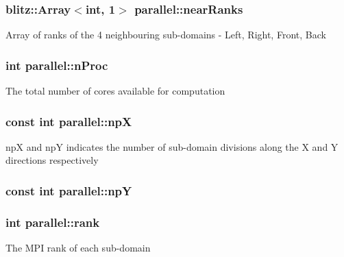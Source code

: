\subsubsection[{\texorpdfstring{near\+Ranks}{nearRanks}}]{\setlength{\rightskip}{0pt plus 5cm}blitz\+::\+Array$<$int, 1$>$ parallel\+::near\+Ranks}\hypertarget{classparallel_a7b13d9a40183bca2c103caf50bb16a51}{}\label{classparallel_a7b13d9a40183bca2c103caf50bb16a51}
Array of ranks of the 4 neighbouring sub-\/domains -\/ Left, Right, Front, Back 
\subsubsection[{\texorpdfstring{n\+Proc}{nProc}}]{\setlength{\rightskip}{0pt plus 5cm}int parallel\+::n\+Proc}\hypertarget{classparallel_afa82c4aacafed73ae34ac5f02bc865fa}{}\label{classparallel_afa82c4aacafed73ae34ac5f02bc865fa}
The total number of cores available for computation 
\subsubsection[{\texorpdfstring{npX}{npX}}]{\setlength{\rightskip}{0pt plus 5cm}const int parallel\+::npX}\hypertarget{classparallel_a7d0143756e8589f09de11b175ea0f167}{}\label{classparallel_a7d0143756e8589f09de11b175ea0f167}
npX and npY indicates the number of sub-\/domain divisions along the X and Y directions respectively 
\subsubsection[{\texorpdfstring{npY}{npY}}]{\setlength{\rightskip}{0pt plus 5cm}const int parallel\+::npY}\hypertarget{classparallel_aa99115d1a61730e862d690f6ccc4e79e}{}\label{classparallel_aa99115d1a61730e862d690f6ccc4e79e}
\subsubsection[{\texorpdfstring{rank}{rank}}]{\setlength{\rightskip}{0pt plus 5cm}int parallel\+::rank}\hypertarget{classparallel_a7e7e97e491ded7bf23632bf9e01aa5a2}{}\label{classparallel_a7e7e97e491ded7bf23632bf9e01aa5a2}
The M\+PI rank of each sub-\/domain 
